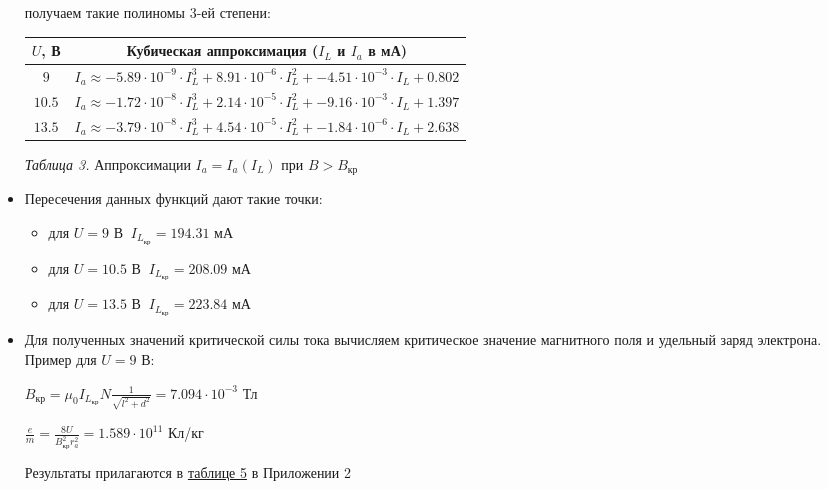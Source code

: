 \begin{itemize}
    получаем такие полиномы 3-ей степени:
    
    \begin{center}
        \begin{tabular}{|c|c|}
            \hline
            $U$, В & Кубическая аппроксимация ($I_L$ и $I_a$ в мА) \\
            \hline
            $9$ & $I_a \approx -5.89 \cdot 10^{-9} \cdot I_L^3 + 8.91 \cdot 10^{-6} \cdot I_L^2 + 
                -4.51 \cdot 10^{-3} \cdot I_L + 0.802$ \\
            \hline
            $10.5$ & $I_a \approx -1.72 \cdot 10^{-8} \cdot I_L^3 + 2.14 \cdot 10^{-5} \cdot I_L^2 + 
                -9.16 \cdot 10^{-3} \cdot I_L + 1.397$ \\
            \hline
            $13.5$ & $I_a \approx -3.79 \cdot 10^{-8} \cdot I_L^3 + 4.54 \cdot 10^{-5} \cdot I_L^2 + 
                -1.84 \cdot 10^{-6} \cdot I_L + 2.638$ \\
            \hline
        \end{tabular}

        \smallvspace

        \textit{Таблица 3.} Аппроксимации $I_a = I_a(I_L)$ при $B > B_\text{кр}$

    \end{center}

    \item Пересечения данных функций дают такие точки: 
    
    \begin{itemize}
        \item для $U = 9$ В $\ I_{L_\text{кр}} = 194.31$ мА
        \item для $U = 10.5$ В $\ I_{L_\text{кр}} = 208.09$ мА
        \item для $U = 13.5$ В $\ I_{L_\text{кр}} = 223.84$ мА
    \end{itemize}

    \item Для полученных значений критической силы тока вычисляем критическое значение магнитного поля
    и удельный заряд электрона. Пример для $U = 9$ В:

    $\displaystyle B_\text{кр} = \mu_0 I_{L_\text{кр}} N \frac{1}{\sqrt{l^2 + d^2}} = 7.094 \cdot 10^{-3}$ Тл

    $\displaystyle \frac{e}{m} = \frac{8 U}{B^2_\text{кр} r^2_a} = 1.589 \cdot 10^{11}$ Кл/кг

    Результаты прилагаются в \hyperlink{table2}{таблице 5} в Приложении 2


\end{itemize}
